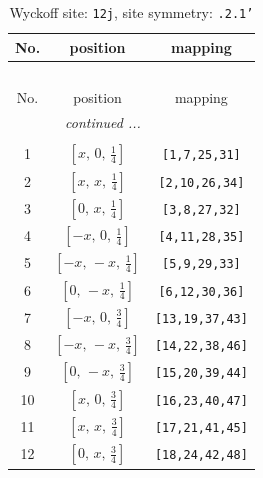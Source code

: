 \documentclass[fleqn,8pt]{jsarticle}
\begin{document}
\begin{longtable}{ccc}
\caption{Wyckoff site: {\tt 12j}, site symmetry: {\tt .2.1'}}
 \\
 \hline \hline
No. & position & mapping \\ \hline \endfirsthead

\multicolumn{2}{l}{\tablename\ \thetable{}} \\
 \hline \hline
No. & position & mapping \\ \hline \endhead

 \hline \hline
\multicolumn{2}{r}{\footnotesize\it continued ...} \\ \endfoot

 \hline \hline
\multicolumn{2}{r}{} \\ \endlastfoot

1 & $\left[ x,\, 0,\, \frac{1}{4} \right]$ & {\tt [1,7,25,31]} \\ \hline
2 & $\left[ x,\, x,\, \frac{1}{4} \right]$ & {\tt [2,10,26,34]} \\ \hline
3 & $\left[ 0,\, x,\, \frac{1}{4} \right]$ & {\tt [3,8,27,32]} \\ \hline
4 & $\left[ - x,\, 0,\, \frac{1}{4} \right]$ & {\tt [4,11,28,35]} \\ \hline
5 & $\left[ - x,\, - x,\, \frac{1}{4} \right]$ & {\tt [5,9,29,33]} \\ \hline
6 & $\left[ 0,\, - x,\, \frac{1}{4} \right]$ & {\tt [6,12,30,36]} \\ \hline
7 & $\left[ - x,\, 0,\, \frac{3}{4} \right]$ & {\tt [13,19,37,43]} \\ \hline
8 & $\left[ - x,\, - x,\, \frac{3}{4} \right]$ & {\tt [14,22,38,46]} \\ \hline
9 & $\left[ 0,\, - x,\, \frac{3}{4} \right]$ & {\tt [15,20,39,44]} \\ \hline
10 & $\left[ x,\, 0,\, \frac{3}{4} \right]$ & {\tt [16,23,40,47]} \\ \hline
11 & $\left[ x,\, x,\, \frac{3}{4} \right]$ & {\tt [17,21,41,45]} \\ \hline
12 & $\left[ 0,\, x,\, \frac{3}{4} \right]$ & {\tt [18,24,42,48]} \\
\end{longtable}
\renewcommand{\arraystretch}{1.2}
\end{document}
